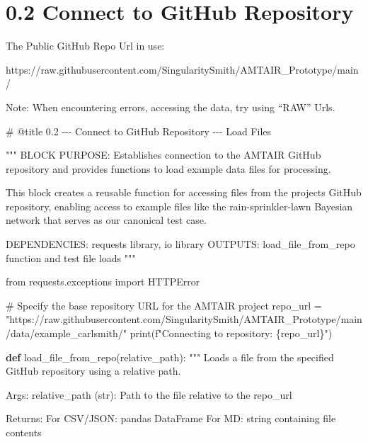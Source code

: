 \documentclass[
  11pt,
  letterpaper,
]{book}
\newenvironment{Shaded}{\begin{snugshade}}{\end{snugshade}}
\newcommand{\BuiltInTok}[1]{\textcolor[rgb]{0.00,0.23,0.31}{#1}}
\newcommand{\CommentTok}[1]{\textcolor[rgb]{0.37,0.37,0.37}{#1}}
\newcommand{\ImportTok}[1]{\textcolor[rgb]{0.00,0.46,0.62}{#1}}
\newcommand{\KeywordTok}[1]{\textcolor[rgb]{0.00,0.23,0.31}{\textbf{#1}}}
\newcommand{\NormalTok}[1]{\textcolor[rgb]{0.00,0.23,0.31}{#1}}
\newcommand{\OperatorTok}[1]{\textcolor[rgb]{0.37,0.37,0.37}{#1}}
\newcommand{\SpecialCharTok}[1]{\textcolor[rgb]{0.37,0.37,0.37}{#1}}
\newcommand{\SpecialStringTok}[1]{\textcolor[rgb]{0.13,0.47,0.30}{#1}}
\newcommand{\StringTok}[1]{\textcolor[rgb]{0.13,0.47,0.30}{#1}}
\begin{document}
\section{0.2 Connect to GitHub
Repository}\label{connect-to-github-repository}

The Public GitHub Repo Url in use:

https://raw.githubusercontent.com/SingularitySmith/AMTAIR\_Prototype/main/

Note: When encountering errors, accessing the data, try using ``RAW''
Urls.

\label{my_code_cell_test}
\begin{Shaded}
\begin{Highlighting}[]
\CommentTok{\# @title 0.2 {-}{-}{-} Connect to GitHub Repository {-}{-}{-} Load Files}

\CommentTok{"""}
\CommentTok{BLOCK PURPOSE: Establishes connection to the AMTAIR GitHub repository and provides}
\CommentTok{functions to load example data files for processing.}

\CommentTok{This block creates a reusable function for accessing files from the project\textquotesingle{}s}
\CommentTok{GitHub repository, enabling access to example files like the rain{-}sprinkler{-}lawn}
\CommentTok{Bayesian network that serves as our canonical test case.}

\CommentTok{DEPENDENCIES: requests library, io library}
\CommentTok{OUTPUTS: load\_file\_from\_repo function and test file loads}
\CommentTok{"""}

\ImportTok{from}\NormalTok{ requests.exceptions }\ImportTok{import}\NormalTok{ HTTPError}

\CommentTok{\# Specify the base repository URL for the AMTAIR project}
\NormalTok{repo\_url }\OperatorTok{=} \StringTok{"https://raw.githubusercontent.com/SingularitySmith/AMTAIR\_Prototype/main/data/example\_carlsmith/"}
\BuiltInTok{print}\NormalTok{(}\SpecialStringTok{f"Connecting to repository: }\SpecialCharTok{\{}\NormalTok{repo\_url}\SpecialCharTok{\}}\SpecialStringTok{"}\NormalTok{)}

\KeywordTok{def}\NormalTok{ load\_file\_from\_repo(relative\_path):}
    \CommentTok{"""}
\CommentTok{    Loads a file from the specified GitHub repository using a relative path.}

\CommentTok{    Args:}
\CommentTok{        relative\_path (str): Path to the file relative to the repo\_url}

\CommentTok{    Returns:}
\CommentTok{        For CSV/JSON: pandas DataFrame}
\CommentTok{        For MD: string containing file contents}


\end{Highlighting}
\end{Shaded}
\end{document}
